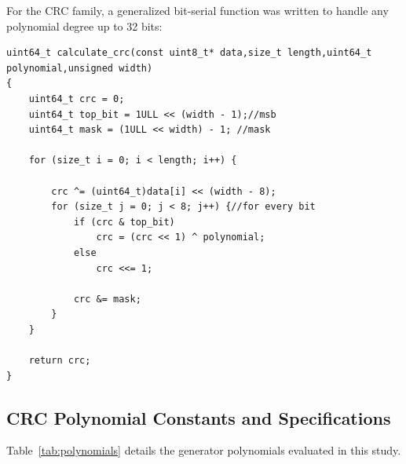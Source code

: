 \documentclass[12pt,a4paper]{article}
\begin{document}
\noindent\begin{minipage}{\linewidth}
For the CRC family, a generalized bit-serial function was written to handle any polynomial degree up to 32 bits:

\begin{lstlisting}[caption={Generalized CRC Algorithm (\texttt{error\_injection.c})}]
uint64_t calculate_crc(const uint8_t* data,size_t length,uint64_t polynomial,unsigned width)
{
    uint64_t crc = 0;
    uint64_t top_bit = 1ULL << (width - 1);//msb
    uint64_t mask = (1ULL << width) - 1; //mask

    for (size_t i = 0; i < length; i++) {

        crc ^= (uint64_t)data[i] << (width - 8);
        for (size_t j = 0; j < 8; j++) {//for every bit
            if (crc & top_bit)
                crc = (crc << 1) ^ polynomial;
            else
                crc <<= 1;

            crc &= mask;
        }
    }

    return crc;
}
\end{lstlisting}
\end{minipage}

\subsection{CRC Polynomial Constants and Specifications}
Table~\ref{tab:polynomials} details the generator polynomials evaluated in this study. 

\begin{table}[htbp]
\centering
\small
{}
\caption{Generator polynomials evaluated across the benchmark suite.}
\label{tab:polynomials}
\end{table}
\end{document}
